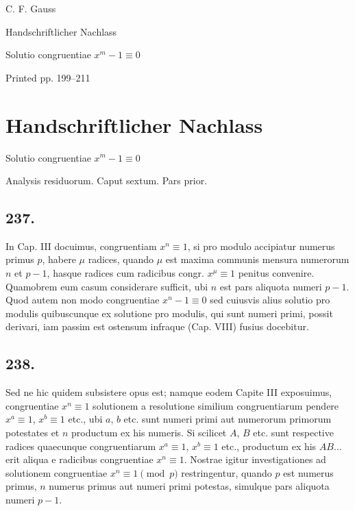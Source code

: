 \documentclass[12pt]{article}
\begin{document}
\begin{center}
{\Large C. F. Gauss}\par
{\large Handschriftlicher Nachlass}\par
{\large Solutio congruentiae $x^m-1\equiv0$}\par
{\large Printed pp. 199--211}
\end{center}

\section*{Handschriftlicher Nachlass}

\begin{center}
{\large Solutio congruentiae $x^m-1 \equiv 0$}\par
{\large Analysis residuorum. Caput sextum. Pars prior.}
\end{center}

\subsection*{237.}
In Cap. III docuimus, congruentiam $x^n\equiv 1$, si pro modulo accipiatur numerus primus $p$, habere $\mu$ radices, quando $\mu$ est maxima communis mensura numerorum $n$ et $p-1$, hasque radices cum radicibus congr. $x^\mu\equiv 1$ penitus convenire. Quamobrem eum casum considerare sufficit, ubi $n$ est pars aliquota numeri $p-1$. Quod autem non modo congruentiae $x^n-1\equiv 0$ sed cuiusvis alius solutio pro modulis quibuscunque ex solutione pro modulis, qui sunt numeri primi, possit derivari, iam passim est ostensum infraque (Cap. VIII) fusius docebitur.

\subsection*{238.}
Sed ne hic quidem subsistere opus est; namque eodem Capite III exposuimus, congruentiae $x^n\equiv 1$ solutionem a resolutione similium congruentiarum pendere $x^a\equiv 1$, $x^b\equiv 1$ etc., ubi $a$, $b$ etc. sunt numeri primi aut numerorum primorum potestates et $n$ productum ex his numeris. Si scilicet $A$, $B$ etc. sunt respective radices quaecunque congruentiarum $x^a\equiv 1$, $x^b\equiv 1$ etc., productum ex his $AB\ldots$ erit aliqua e radicibus congruentiae $x^n\equiv 1$. Nostrae igitur investigationes ad solutionem congruentiae $x^n\equiv 1\pmod p$ restringentur, quando $p$ est numerus primus, $n$ numerus primus aut numeri primi potestas, simulque pars aliquota numeri $p-1$.
\end{document}
